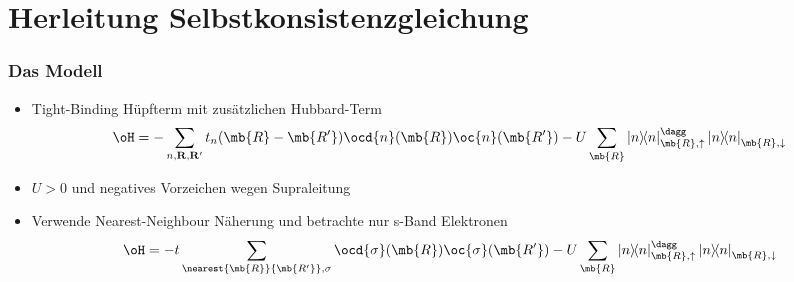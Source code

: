 \section{ Herleitung Selbstkonsistenzgleichung }

\begin{frame}
	\frametitle{ Das Modell }
    \begin{itemize}
        \item Tight-Binding Hüpfterm mit zusätzlichen Hubbard-Term
        \begin{align*}
            \oH = - \sum_{n,\mathbf{R}, \mathbf{R'}} t_n(\mb{R}-\mb{R'}) \ocd{n}(\mb{R}) \oc{n}(\mb{R'}) - U \sum_{\mb{R}} \op{n}^\dagg_{\mb{R}, \uparrow} \op{n}_{\mb{R}, \downarrow}
        \end{align*}
        \item $U>0$ und negatives Vorzeichen wegen Supraleitung
        \item Verwende Nearest-Neighbour Näherung und betrachte nur s-Band Elektronen
        \begin{align*}
            \oH = -t \sum_{\nearest{\mb{R}}{\mb{R'}}, \sigma} \ocd{\sigma}(\mb{R}) \oc{\sigma}(\mb{R'}) - U \sum_{\mb{R}} \op{n}^\dagg_{\mb{R}, \uparrow} \op{n}_{\mb{R}, \downarrow}
        \end{align*}
    \end{itemize}
\end{frame}

